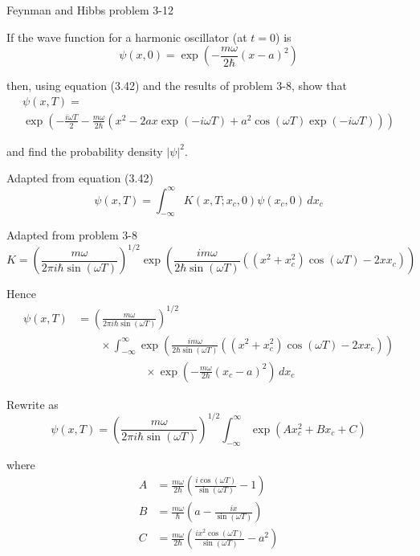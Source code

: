 \documentclass[12pt]{article}
\begin{document}
Feynman and Hibbs problem 3-12

\bigskip
If the wave function for a harmonic oscillator (at $t=0$) is
\begin{equation*}
\psi(x,0)=\exp\left(-\frac{m\omega}{2\hbar}(x-a)^2\right)
\end{equation*}

then, using equation (3.42) and the results of problem 3-8, show that
\begin{multline*}
\psi(x,T)=
\\
\exp\left(
-\frac{i\omega T}{2}-\frac{m\omega}{2\hbar}
\left(x^2-2ax\exp(-i\omega T)+a^2\cos(\omega T)\exp(-i\omega T)\right)
\right)
\end{multline*}

and find the probability density $|\psi|^2$.

\bigskip
Adapted from equation (3.42)
\begin{equation*}
\psi(x,T)=\int_{-\infty}^\infty K(x,T;x_c,0)\psi(x_c,0)\,dx_c
\end{equation*}

Adapted from problem 3-8
\begin{equation*}
K=\left(\frac{m\omega}{2\pi i\hbar\sin(\omega T)}\right)^{1/2}
\exp\left(
\frac{im\omega}{2\hbar\sin(\omega T)}\left((x^2+x_c^2)\cos(\omega T)-2xx_c\right)
\right)
\end{equation*}

Hence
\begin{align*}
\psi(x,T)&=\left(\frac{m\omega}{2\pi i\hbar\sin(\omega T)}\right)^{1/2}
\\
&\qquad{}\times
\int_{-\infty}^\infty \exp\left(
\frac{im\omega}{2\hbar\sin(\omega T)}\left((x^2+x_c^2)\cos(\omega T)-2xx_c\right)
\right)
\\
&\qquad\qquad\qquad{}\times
\exp\left(-\frac{m\omega}{2\hbar}(x_c-a)^2\right)\,dx_c
\end{align*}

Rewrite as
\begin{equation*}
\psi(x,T)=\left(\frac{m\omega}{2\pi i\hbar\sin(\omega T)}\right)^{1/2}
\int_{-\infty}^\infty\exp(Ax_c^2+Bx_c+C)
\tag{1}
\end{equation*}

where
\begin{align*}
A&=\frac{m\omega}{2\hbar}\left(\frac{i\cos(\omega T)}{\sin(\omega T)}-1\right)
\tag{2}
\\
B&=\frac{m\omega}{\hbar}\left(a-\frac{ix}{\sin(\omega T)}\right)
\tag{3}
\\
C&=\frac{m\omega}{2\hbar}\left(\frac{ix^2\cos(\omega T)}{\sin(\omega T)}-a^2\right)
\tag{4}
\end{align*}
\end{document}
